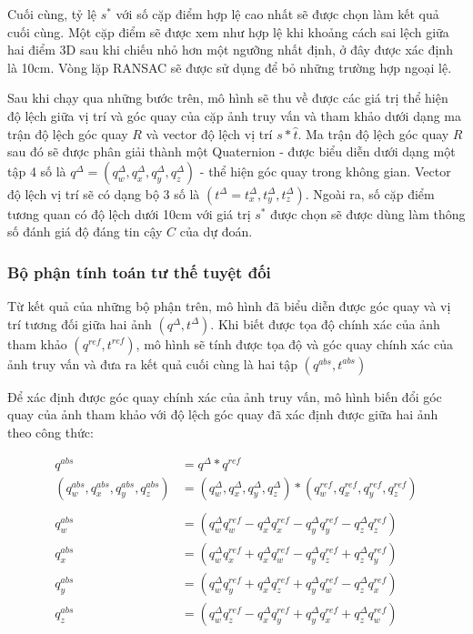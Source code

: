 Cuối cùng, tỷ lệ $s^*$ với số cặp điểm hợp lệ cao nhất sẽ được chọn làm kết quả cuối cùng. Một cặp điểm sẽ được xem như hợp lệ khi khoảng cách sai lệch giữa hai điểm 3D sau khi chiếu nhỏ hơn một ngưỡng nhất định, ở đây được xác định là 10cm. Vòng lặp RANSAC sẽ được sử dụng để bỏ những trường hợp ngoại lệ.

Sau khi chạy qua những bước trên, mô hình sẽ thu về được các giá trị thể hiện độ lệch giữa vị trí và góc quay của cặp ảnh truy vấn và tham khảo dưới dạng ma trận độ lệch góc quay $R$ và vector độ lệch vị trí $s*\hat{t}$. Ma trận độ lệch góc quay $R$ sau đó sẽ được phân giải thành một Quaternion - được biểu diễn dưới dạng một tập 4 số là $q^{\Delta} = (q^{\Delta}_w,q^{\Delta}_x,q^{\Delta}_y,q^{\Delta}_z)$ - thể hiện góc quay trong không gian. Vector độ lệch vị trí sẽ có dạng bộ 3 số là $(t^{\Delta} = t^{\Delta}_x,t^{\Delta}_y,t^{\Delta}_z)$. Ngoài ra, số cặp điểm tương quan có độ lệch dưới 10cm với giá trị $s^*$ được chọn sẽ được dùng làm thông số đánh giá độ đáng tin cậy $C$ của dự đoán.


\subsubsection{Bộ phận tính toán tư thế tuyệt đối}

Từ kết quả của những bộ phận trên, mô hình đã biểu diễn được góc quay và vị trí tương đối giữa hai ảnh $(q^{\Delta},t^{\Delta})$. Khi biết được tọa độ chính xác của ảnh tham khảo $(q^{ref},t^{ref})$, mô hình sẽ tính được tọa độ và góc quay chính xác của ảnh truy vấn và đưa ra kết quả cuối cùng là hai tập $(q^{abs},t^{abs})$

Để xác định được góc quay chính xác của ảnh truy vấn, mô hình biến đổi góc quay của ảnh tham khảo với độ lệch góc quay đã xác định được giữa hai ảnh theo công thức:

$$
  \begin{aligned}
    q^{abs}                                   & = q^{\Delta} * q^{ref}                                                                                    \\
    (q^{abs}_w,q^{abs}_x,q^{abs}_y,q^{abs}_z) & = (q^{\Delta}_w,q^{\Delta}_x,q^{\Delta}_y,q^{\Delta}_z) * (q^{ref}_w,q^{ref}_x,q^{ref}_y,q^{ref}_z)       \\ \\
    q^{abs}_w                                 & =\left(q^{\Delta}_w q^{ref}_w-q^{\Delta}_x q^{ref}_x-q^{\Delta}_y q^{ref}_y-q^{\Delta}_z q^{ref}_z\right) \\
    q^{abs}_x                                 & =\left(q^{\Delta}_w q^{ref}_x+q^{\Delta}_x q^{ref}_w-q^{\Delta}_y q^{ref}_z+q^{\Delta}_z q^{ref}_y\right) \\
    q^{abs}_y                                 & =\left(q^{\Delta}_w q^{ref}_y+q^{\Delta}_x q^{ref}_z+q^{\Delta}_y q^{ref}_w-q^{\Delta}_z q^{ref}_x\right) \\
    q^{abs}_z                                 & =\left(q^{\Delta}_w q^{ref}_z-q^{\Delta}_x q^{ref}_y+q^{\Delta}_y q^{ref}_x+q^{\Delta}_z q^{ref}_w\right)
  \end{aligned}
$$

